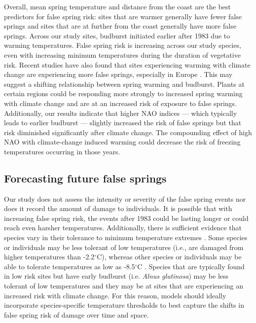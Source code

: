 \documentclass{article}\usepackage[]{graphicx}\usepackage[]{color}
\begin{document}
Overall, mean spring temperature and distance from the coast are the best predictors for false spring risk: sites that are warmer generally have fewer false springs and sites that are at further from the coast generally have more false springs. Across our study sites, budburst initiated earlier after 1983 due to warming temperatures. False spring risk is increasing across our study species, even with increasing minimum temperatures during the duration of vegetative risk. Recent studies have also found that sites experiencing warming with climate change are experiencing more false springs, especially in Europe \citep{Liu2018}. This may suggest a shifting relationship between spring warming and budburst. Plants at certain regions could be responding more strongly to increased spring warming with climate change and are at an increased risk of exposure to false springs. Additionally, our results indicate that higher NAO indices --- which typically leads to earlier budburst --- slightly increased the risk of false springs but that risk diminished significantly after climate change. The compounding effect of high NAO with climate-change induced warming could decrease the risk of freezing temperatures occurring in those years.%

\subsection*{Forecasting future false springs}
Our study does not assess the intensity or severity of the false spring events nor does it record the amount of damage to individuals. It is possible that with increasing false spring risk, the events after 1983 could be lasting longer or could reach even harsher temperatures. Additionally, there is sufficient evidence that species vary in their tolerance to minimum temperature extremes \citep{Korner2016, Lenz2013, Zhuo2018,bennett2018globtherm}. Some species or individuals may be less tolerant of low temperatures (i.e., are damaged from higher temperatures than -2.2$^{\circ}$C), whereas other species or individuals may be able to tolerate temperatures as low as -8.5$^{\circ}$C \citep{Lenz2016}. Species that are typically found in low risk sites but have early budburst (i.e. \textit{Alnus glutinosa}) may be less tolerant of low temperatures and they may be at sites that are experiencing an increased risk with climate change. For this reason, models should ideally incorporate species-specific temperature thresholds to best capture the shifts in false spring risk of damage over time and space. %
\end{document}
